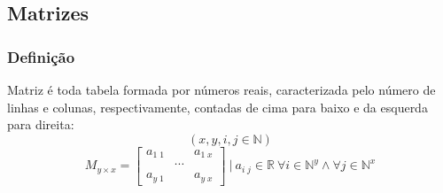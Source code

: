 \subsection{Matrizes}
    \subsubsection{Definição}
        Matriz é toda tabela formada por números reais, caracterizada pelo número de linhas e colunas, respectivamente, contadas de cima para baixo e da esquerda para direita:
        \[ (x, y, i, j \in \mathbb{N}) \]
        \[ M_{y \times x} = \begin{bmatrix} a_{1 \; 1} & & a_{1 \; x} \\ & \cdots & \\ a_{y \; 1} &  & a_{y \; x} \end{bmatrix} \ | \ a_{i \; j} \in \mathbb{R} \ \forall i \in \mathbb{N}^y \wedge  \forall j \in \mathbb{N}^x \]
